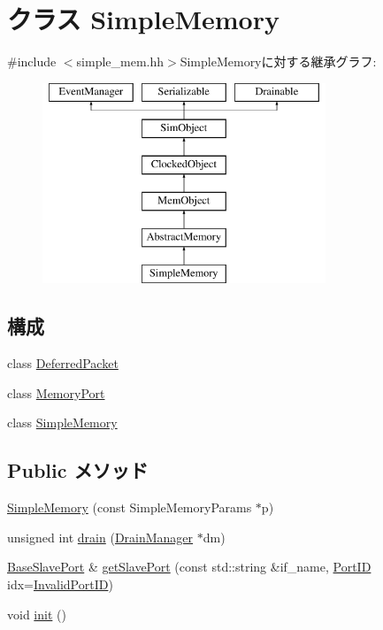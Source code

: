 \hypertarget{classSimpleMemory}{
\section{クラス SimpleMemory}
\label{classSimpleMemory}
}


{\ttfamily \#include $<$simple\_\-mem.hh$>$}SimpleMemoryに対する継承グラフ:\begin{figure}[H]
\begin{center}
\leavevmode
\includegraphics[height=6cm]{classSimpleMemory}
\end{center}
\end{figure}
\subsection*{構成}
\begin{DoxyCompactItemize}
\item 
class \hyperlink{classSimpleMemory_1_1DeferredPacket}{DeferredPacket}
\item 
class \hyperlink{classSimpleMemory_1_1MemoryPort}{MemoryPort}
\item 
class \hyperlink{classSimpleMemory_1_1SimpleMemory}{SimpleMemory}
\end{DoxyCompactItemize}
\subsection*{Public メソッド}
\begin{DoxyCompactItemize}
\item 
\hyperlink{classSimpleMemory_afc0d41f7c9b61cc5161f7f4b10a1b942}{SimpleMemory} (const SimpleMemoryParams $\ast$p)
\item 
unsigned int \hyperlink{classSimpleMemory_aa8a18d230dba7a674ac8a0b4f35bc36a}{drain} (\hyperlink{classDrainManager}{DrainManager} $\ast$dm)
\item 
\hyperlink{classBaseSlavePort}{BaseSlavePort} \& \hyperlink{classSimpleMemory_ac918a145092d7514ebc6dbd952dceafb}{getSlavePort} (const std::string \&if\_\-name, \hyperlink{base_2types_8hh_acef4d7d41cb21fdc252e20c04cd7bb8e}{PortID} idx=\hyperlink{base_2types_8hh_a65bf40f138cf863f0c5e2d8ca1144126}{InvalidPortID})
\item 
void \hyperlink{classSimpleMemory_a02fd73d861ef2e4aabb38c0c9ff82947}{init} ()
\end{DoxyCompactItemize}
